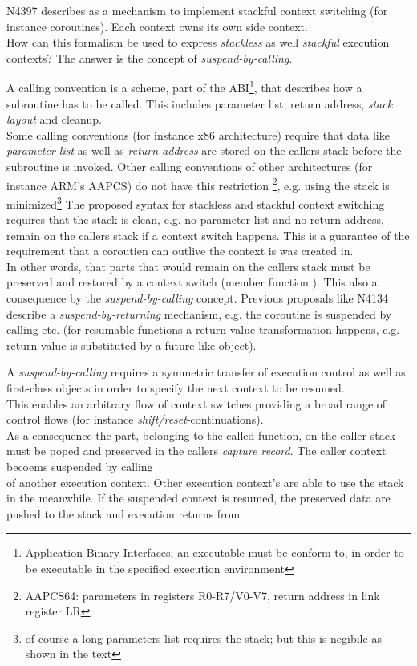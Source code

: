 N4397\cite{N4397} describes \ectx as a mechanism to implement stackful context
switching (for instance coroutines). Each context owns its own side context.\\
How can this formalism be used to express \emph{stackless} as well
\emph{stackful} execution contexts? The answer is the concept of
\emph{suspend-by-calling}.

A calling convention is a scheme, part of the ABI\footnote{Application Binary
Interfaces; an executable must be conform to, in order to be executable in the
specified execution environment}, that describes how a subroutine has to be
called. This includes parameter list, return address, \emph{stack layout} and
cleanup.\\
Some calling conventions (for instance x86 architecture) require that data like
\emph{parameter list} as well as \emph{return address} are stored on the callers
stack before the subroutine is invoked. Other calling conventions of other
architectures (for instance ARM's AAPCS) do not have this restriction
\footnote{AAPCS64: parameters in registers R0-R7/V0-V7, return address in link
register LR}, e.g. using the stack is minimized\footnote{of course a long
parameters list requires the stack; but this is negibile as shown in the text}
\newline
The proposed syntax for stackless and stackful context switching requires that
the stack is clean, e.g. no parameter list and no return address, remain on the
callers stack if a context switch happens. This is a guarantee of the
requirement that a coroutien can outlive the context is was created in.\\
In other words, that parts that would remain on the callers stack must be
preserved and restored by a context switch (member function \ectxop). This also
a consequence by the \emph{suspend-by-calling} concept. Previous proposals like
N4134\cite{N4134} describe a \emph{suspend-by-returning} mechanism, e.g. the
coroutine is suspended by calling \yield etc. (for resumable functions a return
value transformation happens, e.g. return value is substituted by a future-like
object).

A \emph{suspend-by-calling} requires a symmetric transfer of execution control
as well as first-class objects in order to specify the next context to be
resumed.\\
This enables an arbitrary flow of context switches providing a broad range of
control flows (for instance \emph{shift/reset}-continuations).\\
As a consequence the part, belonging to the called function, on the caller stack
must be poped and preserved in the callers \emph{capture record}. The caller
context becoems suspended by calling\\
\ectxop of another execution context. Other execution context's are able to use
the stack in the meanwhile. If the suspended context is resumed, the preserved
data are pushed to the stack and execution returns from \ectxop.

